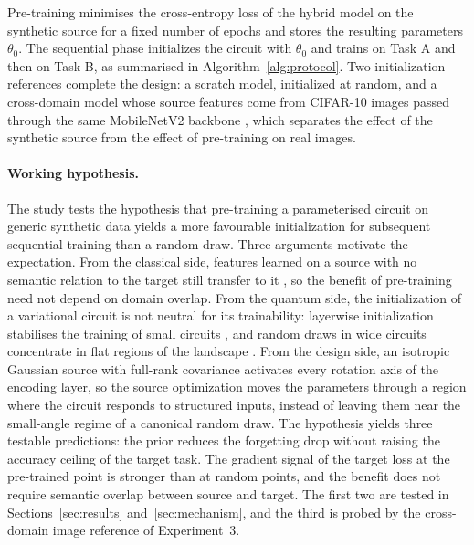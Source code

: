 \documentclass[preprint,number,sort&compress]{elsarticle}
\begin{document}
Pre-training minimises the cross-entropy loss of the hybrid model on the
synthetic source for a fixed number of epochs and stores the resulting
parameters $\theta_0$. The sequential phase initializes the circuit with
$\theta_0$ and trains on Task A and then on Task B, as summarised in
Algorithm~\ref{alg:protocol}. Two initialization references complete the
design: a scratch model, initialized at random, and a cross-domain model
whose source features come from CIFAR-10 images passed through the same
MobileNetV2 backbone \cite{krizhevsky2009cifar}, which separates the effect
of the synthetic source from the effect of pre-training on real images.

\paragraph{Working hypothesis.} The study tests the hypothesis that
pre-training a parameterised circuit on generic synthetic data yields a more
favourable initialization for subsequent sequential training than a random
draw. Three arguments motivate the expectation. From the classical side,
features learned on a source with no semantic relation to the target still
transfer to it \cite{Yosinski14, pan2009survey}, so the benefit of
pre-training need not depend on domain overlap. From the quantum side, the
initialization of a variational circuit is not neutral for its trainability:
layerwise initialization stabilises the training of small circuits
\cite{Skolik21}, and random draws in wide circuits concentrate in flat
regions of the landscape \cite{mcclean2018barren}. From the design side, an
isotropic Gaussian source with full-rank covariance activates every rotation
axis of the encoding layer, so the source optimization moves the parameters
through a region where the circuit responds to structured inputs, instead of
leaving them near the small-angle regime of a canonical random draw. The
hypothesis yields three testable predictions: the prior reduces the
forgetting drop without raising the accuracy ceiling of the target task. The
gradient signal of the target loss at the pre-trained point is stronger than
at random points, and the benefit does not require semantic overlap between
source and target. The first two are tested in
Sections~\ref{sec:results} and~\ref{sec:mechanism}, and the third is probed
by the cross-domain image reference of Experiment~3.
\end{document}
